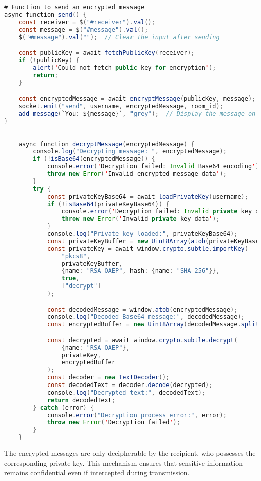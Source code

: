 \documentclass{article}
\begin{document}
\begin{lstlisting}[language=Java, caption={Encrypting and Sending Messages}]


# Function to send an encrypted message
async function send() {
    const receiver = $("#receiver").val();
    const message = $("#message").val();
    $("#message").val("");  // Clear the input after sending

    const publicKey = await fetchPublicKey(receiver);
    if (!publicKey) {
        alert('Could not fetch public key for encryption');
        return;
    }

    const encryptedMessage = await encryptMessage(publicKey, message);
    socket.emit("send", username, encryptedMessage, room_id);
    add_message(`You: ${message}`, "grey");  // Display the message on the sender's side
}
\end{lstlisting}
\begin{lstlisting}[language=Java, caption={Decrypting Messages}]

    async function decryptMessage(encryptedMessage) {
        console.log("Decrypting message: ", encryptedMessage);
        if (!isBase64(encryptedMessage)) {
            console.error('Decryption failed: Invalid Base64 encoding');
            throw new Error('Invalid encrypted message data');
        }
        try {
            const privateKeyBase64 = await loadPrivateKey(username);
            if (!isBase64(privateKeyBase64)) {
                console.error('Decryption failed: Invalid private key data');
                throw new Error('Invalid private key data');
            }
            console.log("Private key loaded:", privateKeyBase64);
            const privateKeyBuffer = new Uint8Array(atob(privateKeyBase64).split('').map(char => char.charCodeAt(0)));
            const privateKey = await window.crypto.subtle.importKey(
                "pkcs8",
                privateKeyBuffer,
                {name: "RSA-OAEP", hash: {name: "SHA-256"}},
                true,
                ["decrypt"]
            );

            const decodedMessage = window.atob(encryptedMessage);
            console.log("Decoded Base64 message:", decodedMessage);
            const encryptedBuffer = new Uint8Array(decodedMessage.split('').map(char => char.charCodeAt(0)));

            const decrypted = await window.crypto.subtle.decrypt(
                {name: "RSA-OAEP"},
                privateKey,
                encryptedBuffer
            );
            const decoder = new TextDecoder();
            const decodedText = decoder.decode(decrypted);
            console.log("Decrypted text:", decodedText);
            return decodedText;
        } catch (error) {
            console.error("Decryption process error:", error);
            throw new Error('Decryption failed');
        }
    }
\end{lstlisting}
The encrypted messages are only decipherable by the recipient, who possesses the corresponding private key. This mechanism ensures that sensitive information remains confidential even if intercepted during transmission.
\end{document}
